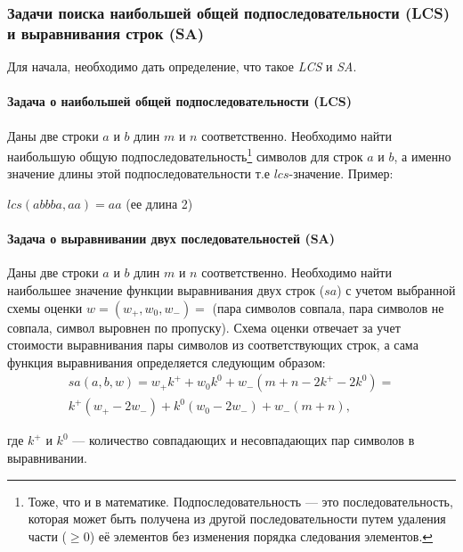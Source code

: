 \subsubsection{Задачи поиска наибольшей общей подпоследовательности (LCS) и выравнивания строк (SA)}

Для начала, необходимо дать определение, что такое \emph{LCS} и \emph{SA}.

\paragraph*{Задача о наибольшей общей подпоследовательности (LCS)}\mbox{}

Даны две строки $a$ и $b$ длин $m$ и $n$ соответственно.
Необходимо найти наибольшую общую подпоследовательность\footnote{Тоже, что и в математике.
Подпоследовательность --- это последовательность, которая может быть получена из другой последовательности путем удаления части ($\geq 0$) её элементов без изменения порядка следования элементов.} символов для строк $a$ и $b$, а именно значение длины этой подпоследовательности т.е $lcs$-значение.
Пример:
\begin{center}
    $lcs(abbba,aa)=aa$ (ее длина 2)
\end{center}
 
\paragraph*{Задача о выравнивании двух последовательностей (SA)}\mbox{}

Даны две строки $a$ и $b$ длин $m$ и $n$ соответственно.
Необходимо найти наибольшее  значение функции выравнивания двух строк ($sa$) с учетом выбранной схемы оценки $w = (w_{+}, w_{0} , w_{-})=$ (пара символов совпала, пара символов не совпала, символ выровнен по пропуску).
Схема оценки отвечает за учет стоимости выравнивания пары символов из соответствующих строк, а сама функция выравнивания определяется следующим образом:
\begin{equation}\label{formula:sa}
\begin{aligned}
    sa(a,b,w) = w_{+}k^{+} + w_{0}k^{0} + w_{-} (m + n - 2k^{+} - 2k^{0}) =\\
    k^{+} (w_{+} - 2w_{-} ) + k^{0}  (w_{0} - 2w_{-}) + w_{-}(m + n),
\end{aligned}
\end{equation}


где $k^{+}$ и $k^{0}$ --- количество совпадающих и несовпадающих пар символов в выравнивании.


